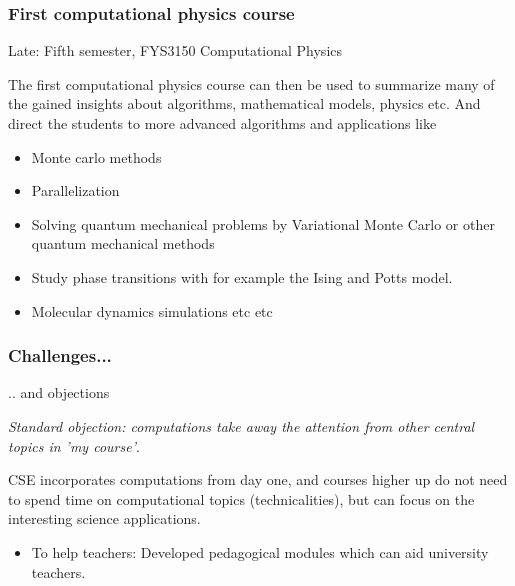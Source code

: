 \documentclass{beamer}
\begin{document}
\begin{frame}
\frametitle{First computational physics course}

\begin{block}{Late: Fifth semester, FYS3150 Computational Physics }

The first computational physics course can then be used to summarize many of the gained insights about algorithms, mathematical models, physics etc. And direct the students to more advanced algorithms and applications like

\begin{itemize}
\item Monte carlo methods

\item Parallelization

\item Solving quantum mechanical problems by Variational Monte Carlo  or other quantum mechanical methods

\item Study phase transitions with for example the Ising and Potts model.

\item Molecular dynamics simulations etc etc 
\end{itemize}

\noindent
\end{block}
\end{frame}

\begin{frame}
\frametitle{Challenges...}

\begin{block}{.. and objections }

\emph{Standard objection: computations take away the attention from other central topics in 'my course'}. 

CSE incorporates computations from day one, and courses higher up do not need to
spend time on computational topics  (technicalities), but can focus on the interesting
science applications.

\begin{itemize}
\item To help teachers: Developed pedagogical modules which can aid university teachers.
\end{itemize}

\noindent
\end{block}
\end{frame}
\end{document}
